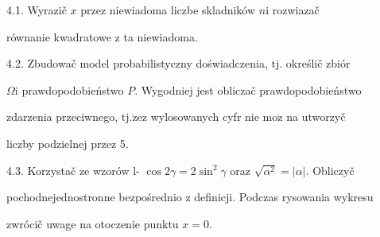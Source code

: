 \documentclass[a4paper,12pt]{article}
\begin{document}
4.1. Wyrazič $x$ przez niewiadoma liczbe skladników $n \mathrm{i}$ rozwiazač

równanie kwadratowe $\mathrm{z}$ ta niewiadoma.

4.2. Zbudowač model probabilistyczny doświadczenia, $\mathrm{t}\mathrm{j}$. określič zbiór

$\Omega \mathrm{i}$ prawdopodobieństwo $P$. Wygodniej jest obliczač prawdopodobieństwo

zdarzenia przeciwnego, $\mathrm{t}\mathrm{j}. \dot{\mathrm{z}}\mathrm{e} \mathrm{z}$ wylosowanych cyfr nie $\mathrm{m}\mathrm{o}\dot{\mathrm{z}}$ na utworzyč

liczby podzielnej przez 5.

4.3. Korzystač ze wzorów l- $\cos 2\gamma=2\sin^{2}\gamma$ oraz $\sqrt{\alpha^{2}}=|\alpha|$. Obliczyč

pochodnejednostronne bezpośrednio $\mathrm{z}$ definicji. Podczas rysowania wykresu

zwrócič uwage na otoczenie punktu $x=0.$
\end{document}
